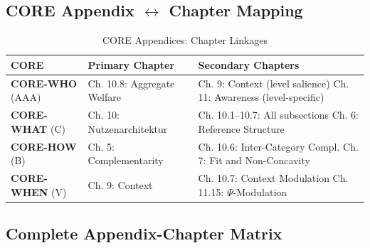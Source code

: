 \subsection{CORE Appendix $\leftrightarrow$ Chapter Mapping}

\begin{table}[htbp]
\centering
\caption{CORE Appendices: Chapter Linkages}
\label{tab:core-chapter-mapping}
\renewcommand{\arraystretch}{1.3}
\begin{tabular}{@{}llp{7cm}@{}}
\toprule
\textbf{CORE} & \textbf{Primary Chapter} & \textbf{Secondary Chapters} \\
\midrule
\textbf{CORE-WHO} (AAA) & Ch. 10.8: Aggregate Welfare & 
    Ch. 9: Context (level salience) \newline
    Ch. 11: Awareness (level-specific) \\
\addlinespace
\textbf{CORE-WHAT} (C) & Ch. 10: Nutzenarchitektur &
    Ch. 10.1--10.7: All subsections \newline
    Ch. 6: Reference Structure \\
\addlinespace
\textbf{CORE-HOW} (B) & Ch. 5: Complementarity & 
    Ch. 10.6: Inter-Category Compl. \newline
    Ch. 7: Fit and Non-Concavity \\
\addlinespace
\textbf{CORE-WHEN} (V) & Ch. 9: Context & 
    Ch. 10.7: Context Modulation \newline
    Ch. 11.15: $\Psi$-Modulation \\
\bottomrule
\end{tabular}
\end{table}

\subsection{Complete Appendix-Chapter Matrix}

